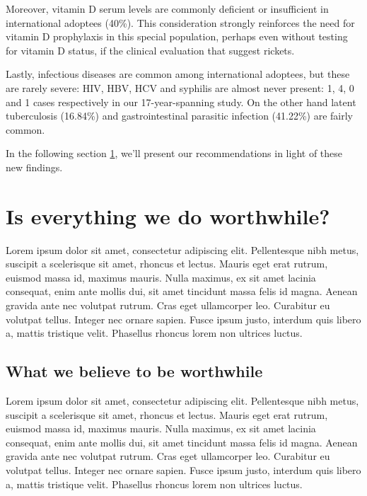 Moreover, vitamin D serum levels are commonly deficient or insufficient in international adoptees (40\%). This consideration strongly reinforces the need for vitamin D prophylaxis  in this special population, perhaps even without testing for vitamin D status, if the clinical evaluation that suggest rickets.

Lastly, infectious diseases are common among international adoptees, but these are rarely severe: HIV, HBV, HCV and syphilis are almost never present: 1, 4, 0 and 1 cases respectively in our 17-year-spanning study. On the other hand latent tuberculosis (16.84\%) and gastrointestinal parasitic infection (41.22\%) are fairly common.

In the following section \ref{sec:worthwhile?}, we'll present our recommendations in light of these new findings.

\section{Is everything we do worthwhile?}\label{sec:worthwhile?}
Lorem ipsum dolor sit amet, consectetur adipiscing elit. Pellentesque nibh metus, suscipit a scelerisque sit amet, rhoncus et lectus. Mauris eget erat rutrum, euismod massa id, maximus mauris. Nulla maximus, ex sit amet lacinia consequat, enim ante mollis dui, sit amet tincidunt massa felis id magna. Aenean gravida ante nec volutpat rutrum. Cras eget ullamcorper leo. Curabitur eu volutpat tellus. Integer nec ornare sapien. Fusce ipsum justo, interdum quis libero a, mattis tristique velit. Phasellus rhoncus lorem non ultrices luctus.

\subsection{What we believe to be worthwhile}\label{sub:worthwhile}
Lorem ipsum dolor sit amet, consectetur adipiscing elit. Pellentesque nibh metus, suscipit a scelerisque sit amet, rhoncus et lectus. Mauris eget erat rutrum, euismod massa id, maximus mauris. Nulla maximus, ex sit amet lacinia consequat, enim ante mollis dui, sit amet tincidunt massa felis id magna. Aenean gravida ante nec volutpat rutrum. Cras eget ullamcorper leo. Curabitur eu volutpat tellus. Integer nec ornare sapien. Fusce ipsum justo, interdum quis libero a, mattis tristique velit. Phasellus rhoncus lorem non ultrices luctus.


